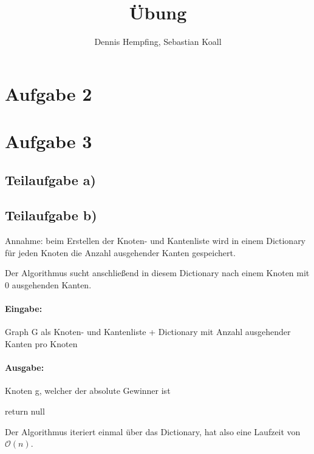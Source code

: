 \documentclass[12pt]{scrartcl}%
\theoremstyle{nonumberplain}
\newcommand{\bO}[1]{\mathcal O(#1)}
\begin{document}
\author{Dennis Hempfing, Sebastian Koall}
\title{Übung}
\date{} 
\pagestyle{myheadings}

\maketitle %
 
\section*{Aufgabe 2}

\newpage

\section*{Aufgabe 3}
\subsection*{Teilaufgabe a)}


\subsection*{Teilaufgabe b)}

Annahme: beim Erstellen der Knoten- und Kantenliste wird in einem Dictionary für jeden Knoten die Anzahl ausgehender Kanten gespeichert. 

Der Algorithmus sucht anschließend in diesem Dictionary nach einem Knoten mit 0 ausgehenden Kanten.

\paragraph{Eingabe:} Graph G als Knoten- und Kantenliste + Dictionary mit Anzahl ausgehender Kanten pro Knoten

\paragraph{Ausgabe:} Knoten g, welcher der absolute Gewinner ist

\begin{algorithm}
	 {
	}
	return null\;
\end{algorithm}

Der Algorithmus iteriert einmal über das Dictionary, hat also eine Laufzeit von $\bO{n}$.
\end{document}
